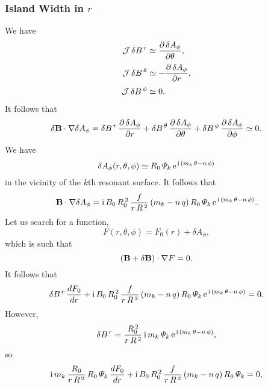 \documentclass[notitlepage,12pt]{article}
\begin{document}
\subsubsection{Island Width in $r$}
We have
\begin{align}
{\cal J}\,\delta B^{\,r} &\simeq \frac{\partial \,\delta A_\phi}{\partial\theta},\\[0.5ex]
{\cal J}\,\delta B^{\,\theta} &\simeq -\frac{\partial\,\delta A_\phi}{\partial r},\\[0.5ex]
{\cal J}\,\delta B^{\,\phi} &\simeq 0.
\end{align}
It follows that
\begin{equation}
\delta {\bf B}\cdot\nabla\delta A_\phi = \delta B^{\,r}\,\frac{\partial\,\delta A_\phi}{\partial r}+  \delta B^{\,\theta}\,\frac{\partial\,\delta A_\phi}{\partial \theta}+  \delta B^{\,\phi}\,\frac{\partial\,\delta A_\phi}{\partial \phi}\simeq 0. 
\end{equation}
We have
\begin{equation}
\delta A_\phi (r,\theta,\phi)\simeq R_0\,{\mit\Psi}_k\,{\rm e}^{\,{\rm i}\,(
m_k\,\theta - n\,\phi)}
\end{equation}
in the vicinity of the $k$th resonant surface. It follows that
\begin{equation}
{\bf B}\cdot\nabla \delta A_\phi = {\rm i}\,B_0\,R_0^{\,2}\,\frac{f}{r\,R^{\,2}}\,(m_k-n\,q)\,R_0\,{\mit\Psi}_k\,{\rm e}^{\,{\rm i}\,(
m_k\,\theta - n\,\phi)}.
\end{equation}
Let us search for a function,
\begin{equation}
F(r,\theta,\phi)= F_0(r) + \delta A_\phi,
\end{equation}
which is such that
\begin{equation}
({\bf B}+\delta {\bf B})\cdot\nabla F = 0.
\end{equation}
It follows that
\begin{equation}
\delta B^{\,r}\,\frac{dF_0}{dr} +{\rm i}\,B_0\,R_0^{\,2}\,\frac{f}{r\,R^{\,2}}\,(m_k-n\,q)\,R_0\,{\mit\Psi}_k\,{\rm e}^{\,{\rm i}\,(m_k\,\theta - n\,\phi)}=0.
\end{equation}
However,
\begin{equation}
\delta B^{\,r} = \frac{R_0^{\,2}}{r\,R^{\,2}}\,{\rm i}\,m_k\,{\mit\Psi}_k\,{\rm e}^{\,{\rm i}\,(m_k\,\theta - n\,\phi)},
\end{equation}
so
\begin{equation}
{\rm i}\,m_k\,\frac{R_0}{r\,R^{\,2}}\,R_0\,{\mit\Psi}_k\,\frac{dF_0}{dr}+{\rm i}\,B_0\,R_0^{\,2}\,\frac{f}{r\,R^{\,2}}\,(m_k-n\,q)\,R_0\,{\mit\Psi}_k=0,
\end{equation}
\end{document}
